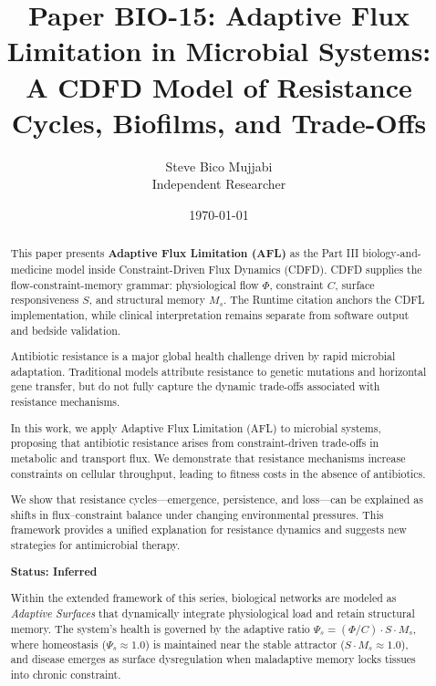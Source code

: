 \documentclass[11pt]{article}
\title{\textbf{Paper BIO-15: Adaptive Flux Limitation in Microbial Systems:\\ A CDFD Model of Resistance Cycles, Biofilms, and Trade-Offs}}
\author{Steve Bico Mujjabi\\ \small Independent Researcher}
\date{\today}
\begin{document}
\maketitle

\begin{abstract}

This paper presents \textbf{Adaptive Flux Limitation (AFL)} as the Part III biology-and-medicine model inside Constraint-Driven Flux Dynamics (CDFD). CDFD supplies the flow-constraint-memory grammar: physiological flow $\Phi$, constraint $C$, surface responsiveness $S$, and structural memory $M_s$. The Runtime citation anchors the CDFL implementation, while clinical interpretation remains separate from software output and bedside validation.


Antibiotic resistance is a major global health challenge driven by rapid microbial adaptation. Traditional models attribute resistance to genetic mutations and horizontal gene transfer, but do not fully capture the dynamic trade-offs associated with resistance mechanisms.

In this work, we apply Adaptive Flux Limitation (AFL) to microbial systems, proposing that antibiotic resistance arises from constraint-driven trade-offs in metabolic and transport flux. We demonstrate that resistance mechanisms increase constraints on cellular throughput, leading to fitness costs in the absence of antibiotics.

We show that resistance cycles—emergence, persistence, and loss—can be explained as shifts in flux–constraint balance under changing environmental pressures. This framework provides a unified explanation for resistance dynamics and suggests new strategies for antimicrobial therapy.

\textbf{Status: Inferred}

\medskip
\noindent Within the extended framework of this series, biological networks are modeled as \emph{Adaptive Surfaces} that dynamically integrate physiological load and retain structural memory. The system's health is governed by the adaptive ratio $\Psi_s = (\Phi/C) \cdot S \cdot M_s$, where homeostasis ($\Psi_s \approx 1.0$) is maintained near the stable attractor ($S \cdot M_s \approx 1.0$), and disease emerges as surface dysregulation when maladaptive memory locks tissues into chronic constraint.

\end{abstract}
\end{document}
